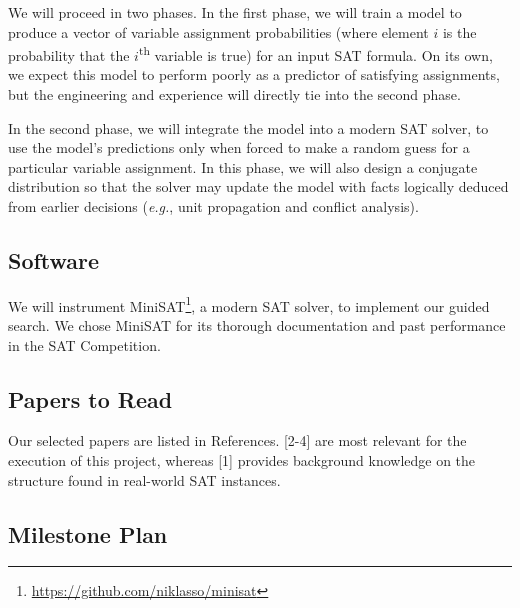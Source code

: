 \documentclass{article}
\begin{document}
We will proceed in two phases. In the first phase, we will train a model to
produce a vector of variable assignment probabilities (where element $i$ is the
probability that the $i$\textsuperscript{th} variable is true) for an input SAT
formula. On its own, we expect this model to perform poorly as a predictor of
satisfying assignments, but the engineering and experience will directly tie
into the second phase.

In the second phase, we will integrate the model into a modern SAT solver, to
use the model's predictions only when forced to make a random guess for a
particular variable assignment. In this phase, we will also design a conjugate
distribution so that the solver may update the model with facts logically
deduced from earlier decisions (\textit{e.g.}, unit propagation and conflict
analysis).


\subsection*{Software}

We will instrument MiniSAT\footnote{\url{https://github.com/niklasso/minisat}},
a modern SAT solver, to implement our guided search.
We chose MiniSAT for its
thorough documentation and past performance in the SAT Competition.

\subsection*{Papers to Read}

Our selected papers are listed in References. [2-4] are most relevant for
the execution of this project, whereas [1] provides background knowledge on the
structure found in real-world SAT instances.

\subsection*{Milestone Plan}
\end{document}
